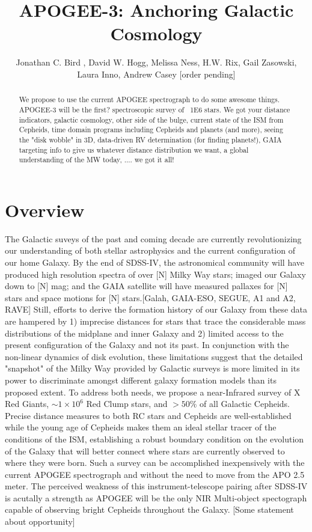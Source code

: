 \documentclass[11pt,preprint]{aastex}
\begin{document}
\title{APOGEE-3: Anchoring Galactic Cosmology}

\author{Jonathan C. Bird , David W. Hogg, Melissa Ness, H.W. Rix, Gail Zasowski, Laura Inno, Andrew Casey [order pending]}


\begin{abstract}
We propose to use the current APOGEE spectrograph to do some awesome things. APOGEE-3 will be the first? spectroscopic survey of ~1E6 stars. We got your distance indicators, galactic cosmology, other side of the bulge, current state of the ISM from Cepheids, time domain programs including Cepheids and planets (and more), seeing the "disk wobble" in 3D, data-driven RV determination (for finding planets!), GAIA targeting info to give us whatever distance distribution we want, a global understanding of the MW today, .... we got it all!
\end{abstract}

\section{Overview}
The Galactic suveys of the past and coming decade are currently revolutionizing our understanding of both stellar astrophysics and the current configuration of our home Galaxy. By the end of SDSS-IV, the astronomical community will have produced high resolution spectra of over [N] Milky Way stars; imaged our Galaxy down to [N] mag; and the GAIA satellite will have measured pallaxes for [N] stars and space motions for [N] stars.[Galah, GAIA-ESO, SEGUE, A1 and A2, RAVE] Still, efforts to derive the formation history of our Galaxy from these data are hampered by 1) imprecise distances for stars that trace the considerable mass distributions of the midplane and inner Galaxy and 2) limited access to the present configuration of the Galaxy and not its past. In conjunction with the non-linear dynamics of disk evolution, these limitations suggest that the detailed "snapshot" of the Milky Way provided by Galactic surveys is more limited in its power to discriminate amongst different galaxy formation models than its proposed extent. To address both needs, we propose a near-Infrared survey of X Red Giants, $\sim 1\times10^6$ Red Clump stars, and $>50\%$ of all Galactic Cepheids. Precise distance measures to both RC stars and Cepheids are well-established while the young age of Cepheids makes them an ideal stellar tracer of the conditions of the ISM, establishing a robust boundary condition on the evolution of the Galaxy that will better connect where stars are currently observed to where they were born. Such a survey can be accomplished inexpensively with the current APOGEE spectrograph and without the need to move from the APO 2.5 meter. The perceived weakness of this instrument-telescope pairing after SDSS-IV is acutally a strength as APOGEE will be the only NIR Multi-object spectograph capable of observing bright Cepheids throughout the Galaxy. [Some statement about opportunity]
\end{document}
